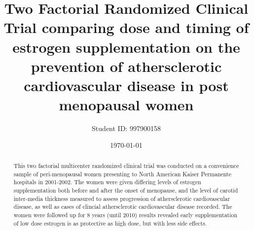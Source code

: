 \documentclass[11pt]{article}
\title{Two Factorial Randomized Clinical Trial comparing dose and timing of estrogen supplementation on the prevention of athersclerotic cardiovascular disease in post menopausal women}
\author{Student ID: 997900158}
\date{\today}
\begin{document}
	\maketitle
	\begin{abstract}
		This two factorial multicenter randomized clinical trial was conducted on a convenience sample of peri-menopausal women presenting to North American Kaiser Permanente hospitals in 2001-2002.
		The women were given differing levels of estrogen supplementation both before and after the onset of menopause, and the level of carotid inter-media thickness measured to assess progression of athersclerotic cardiovascular disease, as well as cases of clincial athersclerotic cardiovascular disease recorded.
		The women were followed up for 8 years (until 2010) results revealed early supplementation of low dose estrogen is as protective as high dose, but with less side effects.

	\end{abstract}

\onehalfspace
\end{document}
